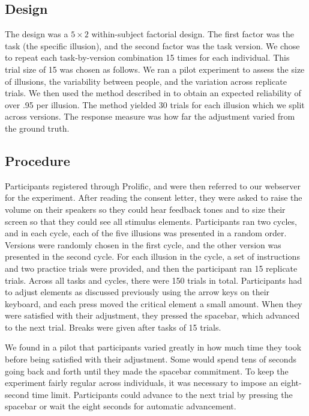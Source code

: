 \documentclass[man, 12pt]{apa7} %
\begin{document}
\subsection{Design}

The design was a $5 \times 2$ within-subject factorial design. The first factor was the task (the specific illusion), and the second factor was the task version.  We chose to repeat each task-by-version combination 15 times for each individual.  This trial size of 15 was chosen as follows.  We ran a pilot experiment to assess the size of illusions, the variability between people, and the variation across replicate trials.  We then used the method described in \textcite{Rouder.Mehrvarz.2024} to obtain an expected reliability of over .95 per illusion.  The method yielded 30 trials for each illusion which we split across versions.  The response measure was how far the adjustment varied from the ground truth.

\subsection{Procedure}

Participants registered through Prolific, and were then referred to our webserver for the experiment. After reading the consent letter, they were asked to raise the volume on their speakers so they could hear feedback tones and to size their screen so that they could see all stimulus elements.  Participants ran two cycles, and in each cycle, each of the five illusions was presented in a random order. Versions were randomly chosen in the first cycle, and the other version was presented in the second cycle. For each illusion in the cycle, a set of instructions and two practice trials were provided, and then the participant ran 15 replicate trials. Across all tasks and cycles, there were 150 trials in total. Participants had to adjust elements as discussed previously using the arrow keys on their keyboard, and each press moved the critical element a small amount. When they were satisfied with their adjustment, they pressed the spacebar, which advanced to the next trial. Breaks were given after tasks of 15 trials.


We found in a pilot that participants varied greatly in how much time they took before being satisfied with their adjustment. Some would spend tens of seconds going back and forth until they made the spacebar commitment. To keep the experiment fairly regular across individuals, it was necessary to impose an eight-second time limit. Participants could advance to the next trial by pressing the spacebar or wait the eight seconds for automatic advancement.
\end{document}
